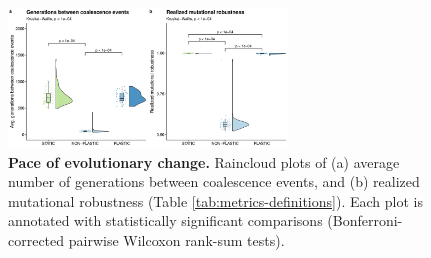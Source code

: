 
\begin{figure}[h!]
    \centering
    \includegraphics[width=0.66\textwidth]{media-evolutionary-change-pace-panel.pdf}
    \caption{\small
    \textbf{Pace of evolutionary change.}
    Raincloud plots of
    (a) average number of generations between coalescence events,
    and (b) realized mutational robustness (Table \ref{tab:metrics-definitions}).
    Each plot is annotated with statistically significant comparisons (Bonferroni-corrected pairwise Wilcoxon rank-sum tests).
    }
    \label{fig:evolutionary-dynamics-rate}
\end{figure}